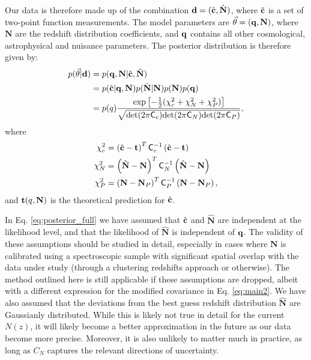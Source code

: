 \documentclass[a4paper,11pt]{article}
\newcommand{\vN}{\mathbf{N}}
\begin{document}
      Our data is therefore made up of the combination ${\bf d}=(\hat{\bf c},\hat{\bf N})$, where $\hat{\bf c}$ is a set of two-point function measurements. The model parameters are $\vec{\theta}=({\bf q},\vN)$, where $\vN$ are the redshift distribution coefficients, and ${\bf q}$ contains all other cosmological, astrophysical and nuisance parameters. The posterior distribution is therefore given by:
      \begin{align}
        p(\vec{\theta}|{\bf d})
        &=p({\bf q},\vN|\hat{\bf c},\hat{\bf N})\\\label{eq:posterior_full}
        &=p(\hat{\bf c}|{\bf q},\vN)p(\hat{\bf N}|\vN)p(\vN)p({\bf q})\\
        &=p(q)\frac{\exp\left[-\frac{1}{2}(\chi^2_c+\chi^2_N+\chi^2_P)\right]}{\sqrt{{\rm det}(2\pi{\sf C}_c){\rm det}(2\pi{\sf C}_N){\rm det}(2\pi{\sf C}_P)}},
      \end{align}
      where
      \begin{align}
        \chi^2_c&=\left(\hat{\bf c}-{\bf t}\right)^T{\sf C}_c^{-1}\left(\hat{\bf c}-{\bf t}\right)\\
        \chi^2_N&=\left(\hat{\bf N}-\vN\right)^T{\sf C}_N^{-1}\left(\hat{\bf N}-\vN\right)\\
        \chi^2_P&=\left(\vN-\vN_P\right)^T{\sf C}_P^{-1}\left(\vN-\vN_P\right),
      \end{align}
      and ${\bf t}(q,\vN)$ is the theoretical prediction for $\hat{\bf c}$.
      
      In Eq. \ref{eq:posterior_full} we have assumed that $\hat{\bf c}$ and $\hat{\vN}$ are independent at the likelihood level, and that the likelihood of $\hat{\vN}$ is independent of ${\bf q}$. The validity of these assumptions should be studied in detail, especially in cases where $\vN$ is calibrated using a spectroscopic sample with significant spatial overlap with the data under study (through a clustering redshifts approach \cite{2008ApJ...684...88N} or otherwise). The method outlined here is still applicable if these assumptions are dropped, albeit with a different expression for the modified covariance in Eq. \ref{eq:main2}. We have also assumed that the deviations from the best guess redshift distribution $\hat{\vN}$ are Gaussianly distributed. While this is likely not true in detail for the current $N(z)$, it will likely become a better approximation in the future as our data become more precise. Moreover, it is also unlikely to  matter much in practice, as long as $C_N$ captures the relevant directions of uncertainty. 
\end{document}

